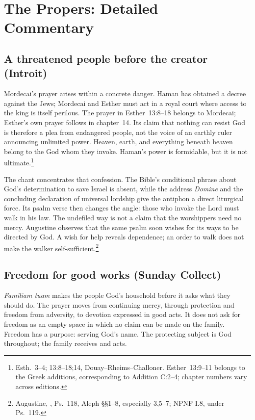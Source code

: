 \section{The Propers: Detailed Commentary}

\subsection{A threatened people before the creator (Introit)}
Mordecai's prayer arises within a concrete danger. Haman has obtained a
decree against the Jews; Mordecai and Esther must act in a royal court
where access to the king is itself perilous. The prayer in Esther~13:8--18
belongs to Mordecai; Esther's own prayer follows in chapter~14. Its claim
that nothing can resist God is therefore a plea from endangered people,
not the voice of an earthly ruler announcing unlimited power. Heaven,
earth, and everything beneath heaven belong to the God whom they invoke.
Haman's power is formidable, but it is not ultimate.\footnote{Esth.~3--4;
13:8--18;14, Douay--Rheims--Challoner. Esther~13:9--11 belongs to the Greek
additions, corresponding to Addition C:2--4; chapter numbers vary across
editions.}

The chant concentrates that confession. The Bible's conditional phrase
about God's determination to save Israel is absent, while the address
\textit{Domine} and the concluding declaration of universal lordship give
the antiphon a direct liturgical force. Its psalm verse then changes the
angle: those who invoke the Lord must walk in his law. The undefiled way
is not a claim that the worshippers need no mercy. Augustine observes that
the same psalm soon wishes for its ways to be directed by God. A wish for
help reveals dependence; an order to walk does not make the walker
self-sufficient.\footnote{Augustine, ,
Ps.~118, Aleph \S\S1--8, especially 3,5--7; NPNF I.8, under Ps.~119.}

\subsection{Freedom for good works (Sunday Collect)}
\textit{Familiam tuam} makes the people God's household before it asks
what they should do. The prayer moves from continuing mercy, through
protection and freedom from adversity, to devotion expressed in good
acts. It does not ask for freedom as an empty space in which no claim can
be made on the family. Freedom has a purpose: serving God's name. The
protecting subject is God throughout; the family receives and acts.

